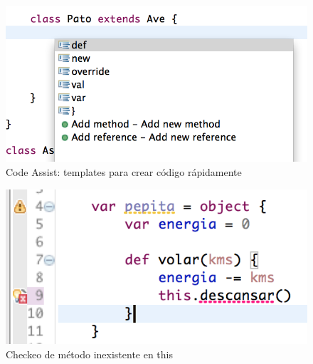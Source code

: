 \documentclass[preprint,10pt]{sigplanconf}
\begin{document}
	\begin{figure}[p]
	    \centering
		\includegraphics[scale=0.5]{images/wollok-paper-codetemplates.png}
	    \caption{Code Assist: templates para crear código rápidamente}
	    \label{fig:codetemplates.png}
	\end{figure}

	\begin{figure}[p]
	    \centering
		\includegraphics[scale=0.5]{images/wollok-paper-check-noMethodOnThis.png}
	    \caption{Checkeo de método inexistente en this}
	    \label{fig:check-noMethodOnThis.png}
	\end{figure}
\end{document}

